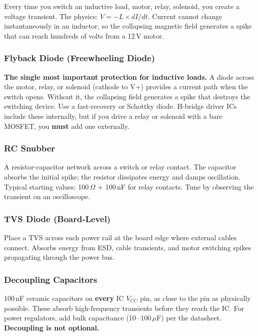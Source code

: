 Every time you switch an inductive load, motor, relay, solenoid, you create a voltage transient. The physics: $V = -L \times dI/dt$. Current cannot change instantaneously in an inductor, so the collapsing magnetic field generates a spike that can reach hundreds of volts from a 12\,V motor.



\subsubsection{Flyback Diode (Freewheeling Diode)}
\textbf{The single most important protection for inductive loads.} A diode across the motor, relay, or solenoid (cathode to V+) provides a current path when the switch opens. Without it, the collapsing field generates a spike that destroys the switching device. Use a fast-recovery or Schottky diode. H-bridge driver ICs include these internally, but if you drive a relay or solenoid with a bare MOSFET, you \textbf{must} add one externally.

\subsubsection{RC Snubber}
A resistor-capacitor network across a switch or relay contact. The capacitor absorbs the initial spike; the resistor dissipates energy and damps oscillation. Typical starting values: 100\,$\Omega$ + 100\,nF for relay contacts. Tune by observing the transient on an oscilloscope.

\subsubsection{TVS Diode (Board-Level)}
Place a TVS across each power rail at the board edge where external cables connect. Absorbs energy from ESD, cable transients, and motor switching spikes propagating through the power bus.

\subsubsection{Decoupling Capacitors}
100\,nF ceramic capacitors on \textbf{every} IC $V_{CC}$ pin, as close to the pin as physically possible. These absorb high-frequency transients before they reach the IC. For power regulators, add bulk capacitance (10\,--100\,$\mu$F) per the datasheet. \textbf{Decoupling is not optional.}


